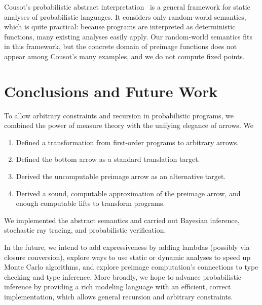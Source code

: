 \documentclass{llncs}
\begin{document}
Cousot's probabilistic abstract interpretation~\cite{cit:cousot-2012esop-prob} is a general framework for static analyses of probabilistic languages.
It considers only random-world semantics, which is quite practical: because programs are interpreted as deterministic functions, many existing analyses easily apply.
Our random-world semantics fits in this framework, but the concrete domain of preimage functions does not appear among Cousot's many examples, and we do not compute fixed points.



\section{Conclusions and Future Work}

To allow arbitrary constraints and recursion in probabilistic programs, we combined the power of measure theory with the unifying elegance of arrows. We
\begin{enumerate}
	\item Defined a transformation from first-order programs to arbitrary arrows.
	\item Defined the bottom arrow as a standard translation target.
	\item Derived the uncomputable preimage arrow as an alternative target.
	\item Derived a sound, computable approximation of the preimage arrow, and enough computable lifts to transform programs.
\end{enumerate}
We implemented the abstract semantics and carried out Bayesian inference, stochastic ray tracing, and probabilistic verification.

In the future, we intend to add expressiveness by adding lambdas (possibly via closure conversion), explore ways to use static or dynamic analyses to speed up Monte Carlo algorithms, and explore preimage computation's connections to type checking and type inference.
More broadly, we hope to advance probabilistic inference by providing a rich modeling language with an efficient, correct implementation, which allows general recursion and arbitrary constraints.

\end{document}
